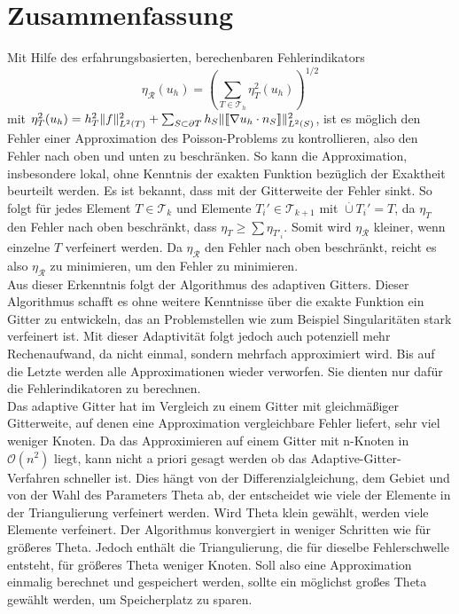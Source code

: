 \chapter{Zusammenfassung}
Mit Hilfe des erfahrungsbasierten, berechenbaren Fehlerindikators
\[
\eta_\mathscr{R}(u_h)=\left(\sum_{T\in\mathscr{T}_h} \eta^2_T(u_h)\right)^{1/2}
\]
mit
$
\eta^2_T(u_h) = h^2_T\|f\|^2_{L^2(T)} + \sum_{S\subset\partial T} h_S\|\llbracket \nabla u_h \cdot n_S\rrbracket\|^2_{L^2(S)} 
$, ist es möglich den Fehler einer Approximation des Poisson-Problems zu kontrollieren, also den Fehler nach oben und unten zu beschränken. So kann die Approximation, insbesondere lokal, ohne Kenntnis der exakten Funktion bezüglich der Exaktheit beurteilt werden. Es ist bekannt, dass mit der Gitterweite der Fehler sinkt. So folgt für jedes Element $T \in \mathscr{T}_k$ und Elemente $T_i'\in \mathscr{T}_{k+1}$ mit $\overset{.}{\cup} T_i' =T$, da $\eta_T$ den Fehler nach oben beschränkt, dass $\eta_T\geq \sum \eta_{T'_i}$. Somit wird $\eta_\mathscr{R}$ kleiner, wenn einzelne $T$ verfeinert werden. Da $\eta_\mathscr{R}$ den Fehler nach oben beschränkt, reicht es also $\eta_\mathscr{R}$ zu minimieren, um den Fehler zu minimieren. \\
Aus dieser Erkenntnis folgt der Algorithmus des adaptiven Gitters. Dieser Algorithmus schafft es ohne weitere Kenntnisse über die exakte Funktion ein Gitter zu entwickeln, das an Problemstellen wie zum Beispiel Singularitäten stark verfeinert ist. Mit dieser Adaptivität folgt jedoch auch potenziell mehr Rechenaufwand, da nicht einmal, sondern mehrfach approximiert wird. Bis auf die Letzte werden alle Approximationen wieder verworfen. Sie dienten nur dafür die Fehlerindikatoren zu berechnen.\\
Das adaptive Gitter hat im Vergleich zu einem Gitter mit gleichmäßiger Gitterweite, auf denen eine Approximation vergleichbare Fehler liefert, sehr viel weniger Knoten. Da das Approximieren auf einem Gitter mit n-Knoten in $\mathcal{O}(n^2)$ liegt, kann nicht a priori gesagt werden ob das Adaptive-Gitter-Verfahren schneller ist. Dies hängt von der Differenzialgleichung, dem Gebiet und von der Wahl des Parameters Theta ab, der entscheidet wie viele der Elemente in der Triangulierung verfeinert werden. Wird Theta klein gewählt, werden viele Elemente verfeinert. Der Algorithmus konvergiert in weniger Schritten wie für größeres Theta. Jedoch enthält die Triangulierung, die für dieselbe Fehlerschwelle entsteht, für größeres Theta weniger Knoten. Soll also eine Approximation einmalig berechnet und gespeichert werden, sollte ein möglichst großes Theta gewählt werden, um Speicherplatz zu sparen. \\
